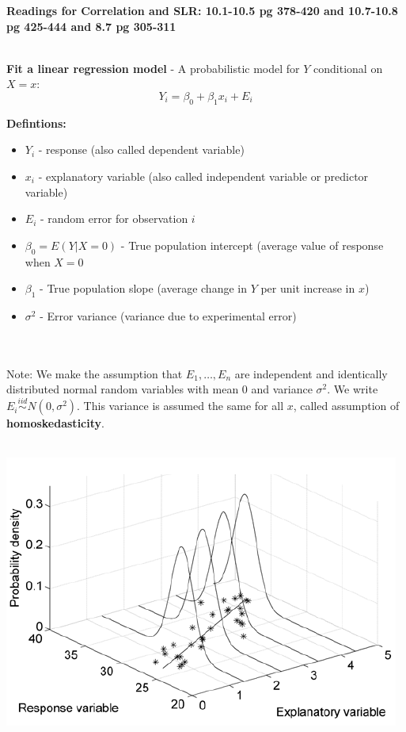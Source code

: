 \begin{center}\large\textbf{Readings for Correlation and SLR: 10.1-10.5 pg 378-420 and 10.7-10.8 pg 425-444 and 8.7 pg 305-311}\\
\normalsize \end{center}
\large \hlinewd{2pt}
~\\

\textbf{Fit a linear regression model} - A probabilistic model for $Y$ conditional on $X=x$:
		$$ Y_i = \beta_0 + \beta_1 x_i + E_i $$

\textbf{Defintions:}
\begin{itemize}
\item $Y_i$ - response (also called dependent variable)
\item $x_i$ - explanatory variable (also called independent variable or predictor variable)
\item $E_i$ - random error for observation $i$
\item $\beta_0=E(Y|X=0)$ - True population intercept (average value of response when $X=0$
\item $\beta_1$ - True population slope (average change in $Y$ per unit increase in $x$)
\item $\sigma^2$ - Error variance (variance due to experimental error)
\end{itemize}

~\\~\\
Note: We make the assumption that $E_1,\ldots,E_n$ are independent and identically distributed normal random variables with mean 0 and variance $\sigma^2$. We write $E_i \stackrel{iid}{\sim} N(0,\sigma^2)$.  This variance is assumed the same for all $x$, called assumption of \textbf{homoskedasticity}.\\~\\

\begin{center}
\includegraphics{regnorm}
\end{center}


